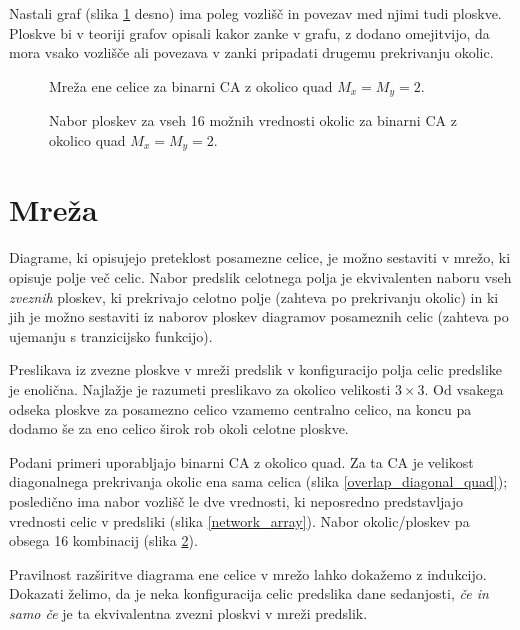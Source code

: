 \documentclass[12pt,a4paper,openany,twoside]{book}
\begin{document}
Nastali graf (slika \ref{network_single} desno) ima poleg vozlišč in povezav med njimi tudi ploskve.
Ploskve bi v teoriji grafov opisali kakor zanke v grafu, z dodano omejitvijo,
da mora vsako vozlišče ali povezava v zanki pripadati drugemu prekrivanju okolic.

\begin{figure}[htb]
\centerline{}
\caption[Mreža ene celice.]{Mreža ene celice za binarni CA z okolico quad \(M_x=M_y=2\).}
\label{network_single}
\end{figure}

\begin{figure}[htb]
\centerline{}
\caption[Nabor ploskev.]{Nabor ploskev za vseh 16 možnih vrednosti okolic za binarni CA z okolico quad \(M_x=M_y=2\).}
\label{neighborhood_surfaces}
\end{figure}

\section{Mreža}

Diagrame, ki opisujejo preteklost posamezne celice, je možno sestaviti v mrežo,
ki opisuje polje več celic. Nabor predslik celotnega polja je ekvivalenten naboru
vseh \textit{zveznih} ploskev, ki prekrivajo celotno polje (zahteva po prekrivanju okolic)
in ki jih je možno sestaviti iz naborov ploskev diagramov posameznih celic (zahteva po ujemanju s tranzicijsko funkcijo).

Preslikava iz zvezne ploskve v mreži predslik v konfiguracijo polja celic predslike je enolična.
Najlažje je razumeti preslikavo za okolico velikosti \(3 \times 3\).
Od vsakega odseka ploskve za posamezno celico vzamemo centralno celico,
na koncu pa dodamo še za eno celico širok rob okoli celotne ploskve.

Podani primeri uporabljajo binarni CA z okolico quad.
Za ta CA je velikost diagonalnega prekrivanja okolic ena sama celica (slika \ref{overlap_diagonal_quad});
posledično ima nabor vozlišč le dve vrednosti, ki neposredno predstavljajo
vrednosti celic v predsliki (slika \ref{network_array}).
Nabor okolic/ploskev pa obsega 16 kombinacij (slika \ref{neighborhood_surfaces}).

Pravilnost razširitve diagrama ene celice v mrežo lahko dokažemo z indukcijo.
Dokazati želimo, da je neka konfiguracija celic predslika dane sedanjosti,
\textit{če in samo če} je ta ekvivalentna zvezni ploskvi v mreži predslik.
\end{document}
